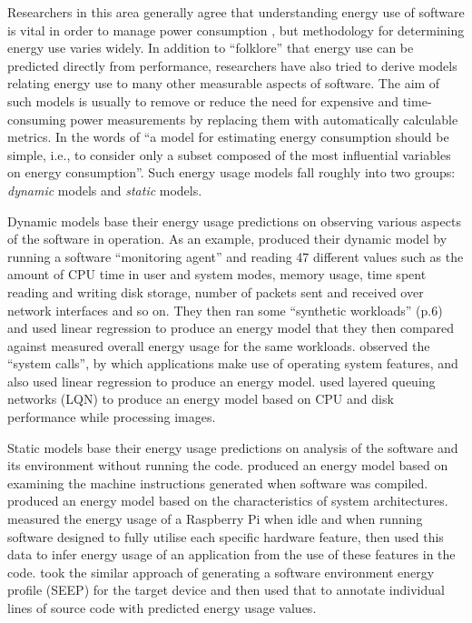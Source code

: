 Researchers in this area generally agree that understanding energy use of software is vital in order to manage power consumption \citep{Snowdon2005}, but methodology for determining energy use varies widely. In addition to \enquote{folklore} that energy use can be predicted directly from performance, researchers have also tried to derive models relating energy use to many other measurable aspects of software. The aim of such models is usually to remove or reduce the need for expensive and time-consuming power measurements by replacing them with automatically calculable metrics. In the words of \citet{Povoa2013} \enquote{a model for estimating energy consumption should be simple, i.e., to consider only a subset composed of the most influential variables on energy consumption}. Such energy usage models fall roughly into two groups: \emph{dynamic} models and \emph{static} models.

Dynamic models base their energy usage predictions on observing various aspects of the software in operation. As an example, \citeauthor{Povoa2013} produced their dynamic model by running a software \enquote{monitoring agent} and reading 47 different values such as the amount of CPU time in user and system modes, memory usage, time spent reading and writing disk storage, number of packets sent and received over network interfaces and so on. They then ran some \enquote{synthetic workloads} (p.6) and used linear regression to produce an energy model that they then compared against measured overall energy usage for the same workloads. \citet{Chowdhury2015} observed the \enquote{system calls}, by which applications make use of operating system features, and also used linear regression to produce an energy model. \citet{Stoico2023} used layered queuing networks (LQN) to produce an energy model based on CPU and disk performance while processing images.

Static models base their energy usage predictions on analysis of the software and its environment without running the code.  \citep{Ibrahim2011} produced an energy model based on examining the machine instructions generated when software was compiled. \citet{Stier2015} produced an energy model based on the characteristics of system architectures. \citet{Ardito2018} measured the energy usage of a Raspberry Pi when idle and when running software designed to fully utilise each specific hardware feature, then used this data to infer energy usage of an application from the use of these features in the code. \citet{Hao2013} took the similar approach of generating a software environment energy profile (SEEP) for the target device and then used that to annotate individual lines of source code with predicted energy usage values.

